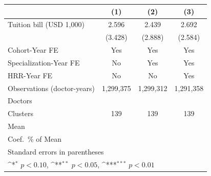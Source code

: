 {
\def\sym#1{\ifmmode^{#1}\else\(^{#1}\)\fi}
\begin{tabular}{l*{3}{c}}
\hline\hline
                    &\multicolumn{1}{c}{(1)}         &\multicolumn{1}{c}{(2)}         &\multicolumn{1}{c}{(3)}         \\
\hline
Tuition bill (USD 1,000)&       2.596         &       2.439         &       2.692         \\
                    &     (3.428)         &     (2.888)         &     (2.584)         \\
[1em]
Cohort-Year FE      &         Yes         &         Yes         &         Yes         \\
[1em]
Specialization-Year FE&          No         &         Yes         &         Yes         \\
[1em]
HRR-Year FE         &          No         &          No         &         Yes         \\
\hline
Observations (doctor-years)&   1,299,375         &   1,299,312         &   1,291,358         \\
Doctors             &                     &                     &                     \\
Clusters            &         139         &         139         &         139         \\
Mean                &                     &                     &                     \\
Coef.\ \% of Mean   &                     &                     &                     \\
\hline\hline
\multicolumn{4}{l}{\footnotesize Standard errors in parentheses}\\
\multicolumn{4}{l}{\footnotesize \sym{*} \(p<0.10\), \sym{**} \(p<0.05\), \sym{***} \(p<0.01\)}\\
\end{tabular}
}
